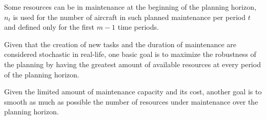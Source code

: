 \documentclass[a4paper,11pt]{article}
\begin{document}
    Some resources can be in maintenance at the beginning of the planning horizon, $n_t$ is used for the number of aircraft in such planned maintenance per period $t$ and defined only for the first $m-1$ time periods.

    Given that the creation of new tasks and the duration of maintenance are considered stochastic in real-life, one basic goal is to maximize the robustness of the planning by having the greatest amount of available resources at every period of the planning horizon. 

    Given the limited amount of maintenance capacity and its cost, another goal is to smooth as much as possible the number of resources under maintenance over the planning horizon.


\clearpage





\end{document}
